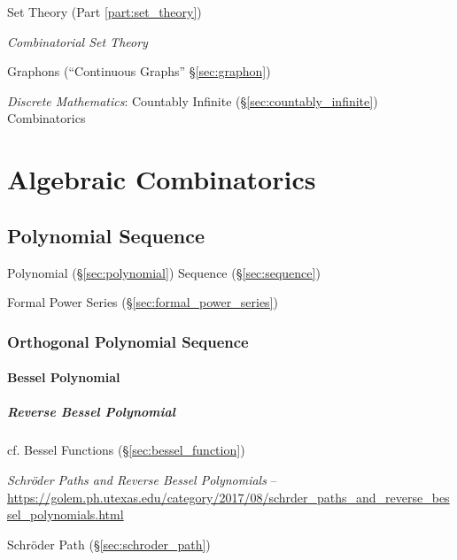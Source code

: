 Set Theory (Part \ref{part:set_theory})

\emph{Combinatorial Set Theory}

Graphons (``Continuous Graphs'' \S\ref{sec:graphon})

\emph{Discrete Mathematics}: Countably Infinite (\S\ref{sec:countably_infinite})
Combinatorics



\section{Algebraic Combinatorics}\label{sec:algebraic_combinatorics}

\subsection{Polynomial Sequence}\label{sec:polynomial_sequence}

Polynomial (\S\ref{sec:polynomial}) Sequence (\S\ref{sec:sequence})

\fist Formal Power Series (\S\ref{sec:formal_power_series})



\subsubsection{Orthogonal Polynomial Sequence}
\label{sec:orthogonal_polynomial_sequence}

\paragraph{Bessel Polynomial}\label{sec:bessel_polynomial}\hfill

\subparagraph{Reverse Bessel Polynomial}\label{sec:reverse_bessel_polynomial}
\hfill

cf. Bessel Functions (\S\ref{sec:bessel_function})

\emph{Schr\"oder Paths and Reverse Bessel Polynomials} --
\url{https://golem.ph.utexas.edu/category/2017/08/schrder_paths_and_reverse_bessel_polynomials.html}

Schr\"oder Path (\S\ref{sec:schroder_path})



